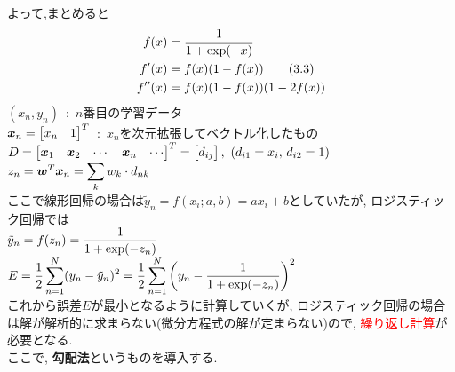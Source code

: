 \documentclass[dvipdfmx,a4j]{jsarticle}
\begin{document}
              よって,まとめると
              \begin{align*}
                f(x) &= \frac{1}{1+{\rm exp}(-x)}\\
               f'(x)&=f(x)(1-f(x)) \tag {3.3} \\
                f''(x)&=f(x)(1-f(x))(1-2f(x))
              \end{align*}
              $(x_{n},y_{n})$\ :\ $n$番目の学習データ\\
              $\mbox{\boldmath $x$}_{n}=\begin{bmatrix} x_{n}&1 \end{bmatrix}^{T}$\ :\ $x_{n}$を次元拡張してベクトル化したもの\\
              $D=\begin{bmatrix}\mbox{\boldmath $x$}_{1}&\mbox{\boldmath $x$}_{2}&\cdots &\mbox{\boldmath $x$}_{n}&\cdots \end{bmatrix}^{T}=\begin{bmatrix}d_{ij}\end{bmatrix},\ (d_{i1}=x_{i},\,d_{i2}=1)$\\
              $z_{n}=\mbox{\boldmath $w$}^{T}\mbox{\boldmath $x$}_{n}=\displaystyle \sum_{k}w_{k}\cdot d_{nk}$\\
              ここで線形回帰の場合は$\tilde{y}_{n}=f(x_{i};a,b)=ax_{i}+b$としていたが, ロジスティック回帰では\\
              $\tilde{y}_{n}=f(z_{n})=\displaystyle \frac{1}{1+{\rm exp}(-z_{n})}$\\[0.1cm]
              $\displaystyle E=\frac{1}{2}\sum_{n=1}^{N}(y_{n}-\tilde{y}_{n})^{2}=\frac{1}{2}\sum_{n=1}^{N}\left(y_{n}-\frac{1}{1+{\rm exp}(-z_{n})}\right)^{2}$\\[1cm]
              これから誤差$E$が最小となるように計算していくが, ロジスティック回帰の場合は解が解析的に求まらない(微分方程式の解が定まらない)ので, \textcolor{red}{繰り返し計算}が必要となる.\\
              ここで, {\bf 勾配法}というものを導入する.
\end{document}
